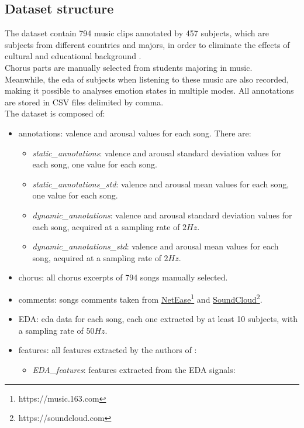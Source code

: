 \subsection{Dataset structure}
The dataset contain 794 music clips annotated by 457 subjects, which are subjects from different countries and majors, in order to eliminate the effects of cultural and educational background \cite{hu2017cross}.
\\
Chorus parts are manually selected from students majoring in music.
\\ \indent
Meanwhile, the \gls{eda} of subjects when listening to these music are also recorded, making it possible to analyses emotion states in multiple modes. All annotations are stored in CSV files delimited by comma.
\\
The dataset is composed of:
\begin{itemize}
	\item annotations: valence and arousal values for each song. There are:
	\begin{itemize}
		\item \textit{static\_annotations}: valence and arousal standard deviation values for each song, one value for each song.
		\item \textit{static\_annotations\_std}: valence and arousal mean values for each song, one value for each song.
		\item \textit{dynamic\_annotations}: valence and arousal standard deviation values for each song, acquired at a sampling rate of $2Hz$.
		\item \textit{dynamic\_annotations\_std}: valence and arousal mean values for each song, acquired at a sampling rate of $2Hz$.
	\end{itemize}
	\item chorus: all chorus excerpts of 794 songs manually selected.
	\item comments: songs comments taken from \href{https://music.163.com}{NetEase}\footnote{https://music.163.com} and \href{https://soundcloud.com}{SoundCloud}\footnote{https://soundcloud.com}.
	\item EDA: \gls{eda} data for each song, each one extracted by at least 10 subjects, with a sampling rate of $50Hz$.
	\item features: all features extracted by the authors of \cite{zhang2018pmemo}:
	\begin{itemize}
		\item \textit{EDA\_features}: features extracted from the EDA signals:
		\begin{itemize}

\end{itemize}
\end{itemize}
\end{itemize}
